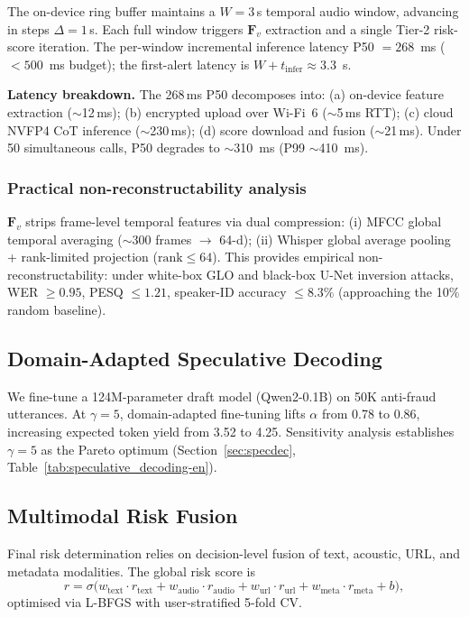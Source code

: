 \documentclass[final,5p,times,number]{elsarticle}
\begin{document}
The on-device ring buffer maintains a $W = 3$\,s temporal audio window, advancing in steps $\Delta = 1$\,s. Each full window triggers $\bm{F}_v$ extraction and a single Tier-2 risk-score iteration. The per-window incremental inference latency P50 $=268$~ms ($<500$~ms budget); the first-alert latency is $W + t_{\mathrm{infer}}\approx 3.3$~s.

\medskip
\noindent\textbf{Latency breakdown.} The 268\,ms P50 decomposes into: (a) on-device feature extraction ($\sim$12\,ms); (b) encrypted upload over Wi-Fi~6 ($\sim$5\,ms RTT); (c) cloud NVFP4 CoT inference ($\sim$230\,ms); (d) score download and fusion ($\sim$21\,ms). Under 50 simultaneous calls, P50 degrades to $\sim$310~ms (P99 $\sim$410~ms).

\subsubsection{Practical non-reconstructability analysis}

$\bm{F}_v$ strips frame-level temporal features via dual compression: (i) MFCC global temporal averaging ($\sim$300 frames $\rightarrow$ 64-d); (ii) Whisper global average pooling + rank-limited projection ($\text{rank}\le 64$). This provides empirical non-reconstructability: under white-box GLO and black-box U-Net inversion attacks, WER $\ge 0.95$, PESQ $\le 1.21$, speaker-ID accuracy $\le 8.3\%$ (approaching the 10\% random baseline).

\subsection{Domain-Adapted Speculative Decoding}\label{sec:specdec-method}

We fine-tune a 124M-parameter draft model (Qwen2-0.1B) on 50K anti-fraud utterances. At $\gamma = 5$, domain-adapted fine-tuning lifts $\alpha$ from 0.78 to 0.86, increasing expected token yield from 3.52 to 4.25. Sensitivity analysis establishes $\gamma = 5$ as the Pareto optimum (Section~\ref{sec:specdec}, Table~\ref{tab:speculative_decoding-en}).

\subsection{Multimodal Risk Fusion}

Final risk determination relies on decision-level fusion of text, acoustic, URL, and metadata modalities. The global risk score is
\begin{equation}
\label{eq:fusion}
r = \sigma\bigl(w_{\mathrm{text}}\cdot r_{\mathrm{text}}
+ w_{\mathrm{audio}}\cdot r_{\mathrm{audio}} + w_{\mathrm{url}}\cdot r_{\mathrm{url}} + w_{\mathrm{meta}}\cdot r_{\mathrm{meta}} + b\bigr),
\end{equation}
optimised via L-BFGS with user-stratified 5-fold CV.
\end{document}
